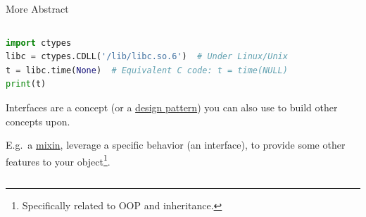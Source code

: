 \documentclass[9pt]{beamer}
\begin{document}
\begin{frame}[fragile]{More Abstract}
\begin{columns}
\begin{column}{0.5\textwidth}
            \begin{lstlisting}[language=Python,style=mystyle]
import ctypes
libc = ctypes.CDLL('/lib/libc.so.6')  # Under Linux/Unix
t = libc.time(None)  # Equivalent C code: t = time(NULL)
print(t)\end{lstlisting}
            \vspace*{20pt}

            Interfaces are a concept (or a
            \href{https://refactoring.guru/design-patterns}{design pattern})
            you can also use to build other concepts upon.\newline

            E.g.\ a \href{https://en.wikipedia.org/wiki/Mixin}{mixin}, leverage
            a specific behavior (an interface), to provide some other features
            to your object\footnote{
                Specifically related to OOP and inheritance.
            }.
        \end{column}
    \end{columns}
\end{frame}
\end{document}
